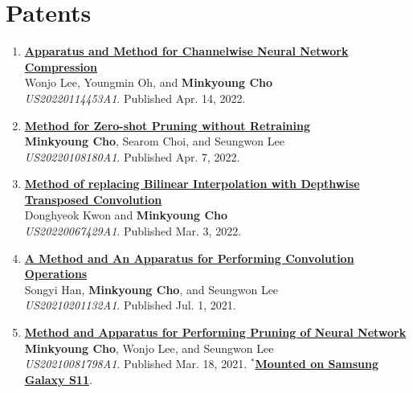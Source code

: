 \documentclass[letterpaper,oneside,11pt]{article}
\begin{document}
\section{Patents}
\begin{enumerate}[leftmargin=*, itemsep=0em]
  \item \small \textbf{\href{https://patentimages.storage.googleapis.com/82/b3/b5/3652b77fd7fe2a/US20220114453A1.pdf}{Apparatus and Method for Channelwise Neural Network Compression}}\\
  Wonjo Lee, Youngmin Oh, and \textbf{Minkyoung Cho}\\
  \textit{US20220114453A1}. Published Apr. 14, 2022.
  \item \small \textbf{\href{https://patentimages.storage.googleapis.com/2a/76/c3/1436cb6d759f01/US20220108180A1.pdf}{Method for Zero-shot Pruning without Retraining}}\\
  \textbf{Minkyoung Cho}, Searom Choi, and Seungwon Lee\\
  \textit{US20220108180A1}. Published Apr. 7, 2022.
  \item \small \textbf{\href{https://patentimages.storage.googleapis.com/65/93/b5/0087b1b6fdf1bd/US20220067429A1.pdf}{Method of replacing Bilinear Interpolation with Depthwise Transposed Convolution}}\\
  Donghyeok Kwon and \textbf{Minkyoung Cho}\\
  \textit{US20220067429A1}. Published Mar. 3, 2022.
  \item \small \textbf{\href{https://patentimages.storage.googleapis.com/d4/9e/74/0f46f5127f65e5/US20210201132A1.pdf}{A Method and An Apparatus for Performing Convolution Operations}}\\
  Songyi Han, \textbf{Minkyoung Cho}, and Seungwon Lee\\
   \textit{US20210201132A1}. Published Jul. 1, 2021.
  \item \small \textbf{\href{https://patentimages.storage.googleapis.com/c1/cb/54/45c128411b5489/US20210081798A1.pdf}{Method and Apparatus for Performing Pruning of Neural Network}} \\
  \textbf{Minkyoung Cho}, Wonjo Lee, and Seungwon Lee\\
  \textit{US20210081798A1}. Published Mar. 18, 2021. \underline{$^\ast$\textbf{Mounted on Samsung Galaxy S11}}.   
\end{enumerate}
  
\end{document}
